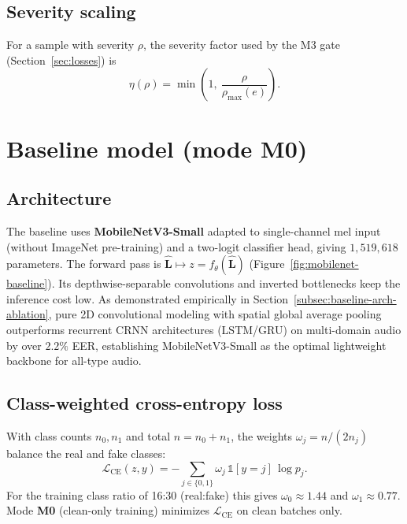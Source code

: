 
\subsection{Severity scaling}

For a sample with severity $\rho$, the severity factor used by the M3 gate (Section~\ref{sec:losses}) is
\begin{equation}
\eta(\rho) = \min\!\left(1,\ \frac{\rho}{\rho_{\max}(e)}\right).
\label{eq:eta}
\end{equation}

\section{Baseline model (mode M0)}
\label{sec:baseline}

\subsection{Architecture}

The baseline uses \textbf{MobileNetV3-Small} adapted to single-channel mel input (without ImageNet pre-training) and a two-logit classifier head, giving $1{,}519{,}618$ parameters. The forward pass is $\hat{\mathbf{L}} \mapsto z = f_\theta(\hat{\mathbf{L}})$ (Figure~\ref{fig:mobilenet-baseline}). Its depthwise-separable convolutions and inverted bottlenecks keep the inference cost low. As demonstrated empirically in Section~\ref{subsec:baseline-arch-ablation}, pure 2D convolutional modeling with spatial global average pooling outperforms recurrent CRNN architectures (LSTM/GRU) on multi-domain audio by over $2.2\%$ EER, establishing MobileNetV3-Small as the optimal lightweight backbone for all-type audio.



\subsection{Class-weighted cross-entropy loss}

With class counts $n_0, n_1$ and total $n = n_0 + n_1$, the weights $\omega_j = n / (2 n_j)$ balance the real and fake classes:
\begin{equation}
\mathcal{L}_{\mathrm{CE}}(z, y) = -\sum_{j \in \{0,1\}} \omega_j \,\mathbb{1}[y=j]\,\log p_j .
\label{eq:ce}
\end{equation}
For the training class ratio of 16:30 (real:fake) this gives $\omega_0 \approx 1.44$ and $\omega_1 \approx 0.77$. Mode \textbf{M0} (clean-only training) minimizes $\mathcal{L}_{\mathrm{CE}}$ on clean batches only.

